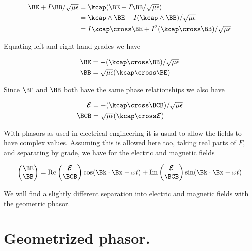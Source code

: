 \begin{align*}
\BE + I\BB/\sqrt{\mu\epsilon} 
&= \kcap (\BE + I\BB/\sqrt{\mu\epsilon} ) \\
&= \kcap \wedge \BE + I (\kcap \wedge \BB)/\sqrt{\mu\epsilon}  \\
&= I \kcap \cross \BE + I^2 (\kcap \cross \BB)/\sqrt{\mu\epsilon} 
\end{align*}

Equating left and right hand grades we have

\begin{align}\label{eqn:fooD}
\BE &= -(\kcap \cross \BB)/\sqrt{\mu\epsilon} \\
\BB &= \sqrt{\mu\epsilon} (\kcap \cross \BE)
\end{align}

Since $\BE$ and $\BB$ both have the same phase relationships we also have 

\begin{align}\label{eqn:fooDD}
\EE &= -(\kcap \cross \BCB)/\sqrt{\mu\epsilon} \\
\BCB &= \sqrt{\mu\epsilon} (\kcap \cross \EE)
\end{align}

With phasors as used in electrical engineering it is usual to allow the fields to have complex values.  Assuming this is allowed here too, taking real parts of $F$, and separating by grade, we have for the electric and magnetic fields

\begin{align}\label{eqn:fooX}
\begin{pmatrix}
\BE \\
\BB
\end{pmatrix}
=
\Real
\begin{pmatrix}
\EE \\
\BCB
\end{pmatrix}
\cos(\Bk \cdot \Bx - \omega t)
+\Imag
\begin{pmatrix}
\EE \\
\BCB
\end{pmatrix}
\sin(\Bk \cdot \Bx - \omega t)
\end{align}

We will find a slightly different separation into electric and magnetic fields with the geometric phasor.

\section{Geometrized phasor.}

